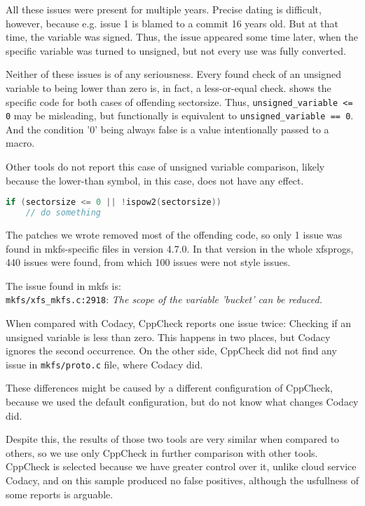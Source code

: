 All these issues were present for multiple years. Precise dating is
difficult, however, because e.g. issue 1 is blamed to a commit 16 years
old. But at that time, the variable was signed. Thus, the issue appeared
some time later, when the specific variable was turned to unsigned, but not
every use was fully converted.

Neither of these issues is of any seriousness. Every found check of an
unsigned variable to being lower than zero is, in fact, a less-or-equal
check.  shows the specific code for both cases
of offending sectorsize. Thus, {\tt unsigned\_variable <= 0} may be
misleading, but functionally is equivalent to {\tt unsigned\_variable ==
0}.  And the condition '0' being always false is a value intentionally
passed to a macro.

Other tools do not report this case of unsigned variable comparison,
likely because the lower-than symbol, in this case, does not have any effect.

\begin{lstlisting}[frame=none, basicstyle=\footnotesize\ttfamily,
language=C, numbers=none, numberstyle=\tiny\color{black},caption=
{Condition in which unsigned sectorsize is tested to be less than zero.},
label={lst:results:sectorsize}]
if (sectorsize <= 0 || !ispow2(sectorsize))
	// do something
\end{lstlisting}

The patches we wrote removed most of the offending code, so only 1 issue was
found in mkfs-specific files in version 4.7.0. In that version in the whole
xfsprogs, 440 issues were found, from which 100 issues were not style issues.

The issue found in mkfs  is:\\
{\tt mkfs/xfs\_mkfs.c:2918}: {\em The scope of the variable 'bucket' can be
reduced.}

When compared with Codacy, CppCheck reports one issue twice: Checking if an
unsigned variable is less than zero. This happens in two places, but Codacy
ignores the second occurrence. On the other side, CppCheck did not find any
issue in {\tt mkfs/proto.c} file, where Codacy did.

These differences might be caused by a different configuration of CppCheck,
because we used the default configuration, but do not know what changes
Codacy did.

Despite this, the results of those two tools are very similar when compared
to others, so we use only CppCheck in further comparison with other tools.
CppCheck is selected because we have greater control over it, unlike cloud
service Codacy, and on this sample produced no false positives, although the
usfullness of some reports is arguable.

